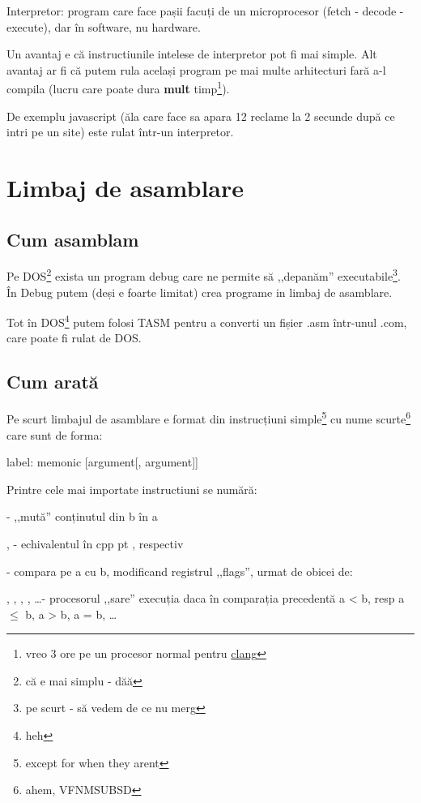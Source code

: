 \documentclass[11pt,a4paper]{article}
\begin{document}
Interpretor: program care face pașii facuți de un microprocesor (fetch - decode -execute), dar în software, nu hardware.

Un avantaj e că instructiunile intelese de interpretor pot fi mai simple.
Alt avantaj ar fi că putem rula același program pe mai multe arhitecturi fară a-l compila (lucru care poate dura \textbf{mult} timp\footnote{vreo 3 ore pe un procesor normal pentru \href{http://clang.llvm.org/}{clang}}).

De exemplu javascript (ăla care face sa apara 12 reclame la 2 secunde după ce intri pe un site) este rulat într-un interpretor.

\section{Limbaj de asamblare}
\subsection*{Cum asamblam}
Pe DOS\footnote{că e mai simplu - dăă} exista un program debug care ne permite să ,,depanăm'' executabile\footnote{pe scurt - să vedem de ce nu merg}.
În Debug putem (deși e foarte limitat) crea programe in limbaj de asamblare.

Tot în DOS\footnote{heh} putem folosi TASM pentru a converti un fișier .asm într-unul .com, care poate fi rulat de DOS.

\subsection*{Cum arată}
Pe scurt limbajul de asamblare e format din instrucțiuni simple\footnote{except for when they arent} cu nume scurte\footnote{ahem, VFNMSUBSD} care sunt de forma:
\begin{asm}
  label: memonic [argument[, argument]]
\end{asm}

Printre cele mai importate instructiuni se numără:

\quad \quad {} - ,,mută'' conținutul din b în a

\quad \quad {},  - echivalentul în cpp pt , respectiv 

\quad \quad {} - compara pe a cu b, modificand registrul ,,flags'', urmat de obicei de: 

\quad \quad {}, , , , \ldots - procesorul ,,sare'' execuția daca în comparația precedentă a < b, resp a $\le$  b, a > b, a = b, \ldots
\end{document}

